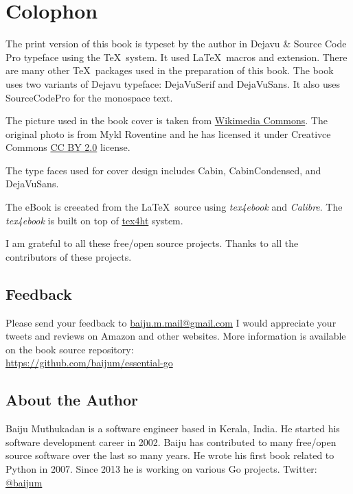 \cleardoublepage
{}
\chapter*{Colophon}

The print version of this book is typeset by the author in Dejavu \&
Source Code Pro typeface using the
\TeX\ system.  It used \LaTeX\ macros and {} extension.
There are many other \TeX\ packages used in the preparation of this
book.  The book uses two variants of Dejavu typeface: DejaVuSerif and
DejaVuSans. It also uses SourceCodePro for the monospace text.

The picture used in the book cover is taken from
\href{https://commons.wikimedia.org/wiki/File:The_ladder_of_life_is_full_of_splinters.jpg}{Wikimedia Commons}.
The original photo is from Mykl Roventine and he has licensed it under
Creativce
Commons \href{https://creativecommons.org/licenses/by/2.0}{CC BY 2.0}
license.

The type faces used for cover design includes Cabin, CabinCondensed,
and DejaVuSans.

The eBook is creeated from the \LaTeX\ source using \textit{tex4ebook}
and \textit{Calibre}.  The \textit{tex4ebook} is built on top
of \href{http://www.tug.org/tex4ht}{tex4ht} system.

I am grateful to all these free/open source projects.  Thanks to all
the contributors of these projects.

\section*{Feedback}

Please send your feedback
to \href{mailto:baiju.m.mail@gmail.com}{baiju.m.mail@gmail.com} I would
appreciate your tweets and reviews on Amazon and other websites.  More
information is available on the book
source repository:\\ \url{https://github.com/baijum/essential-go}

\pagebreak
\thispagestyle{empty} %

\section*{About the Author}

Baiju Muthukadan is a software engineer based in Kerala, India. He started his
software development career in 2002. Baiju has contributed to many free/open
source software over the last so many years. He wrote his first book related to
Python in 2007. Since 2013 he is working on various Go projects. Twitter:
\href{https://twitter.com/baijum}{@baijum}
